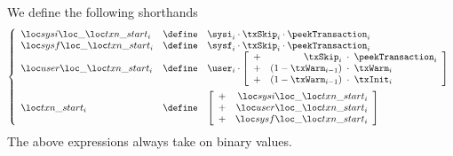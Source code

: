 We define the following shorthands
\[
	\left\{ \begin{array}{lcl}
		\sysiTransactionStart _{i} & \define & \sysi _{i} \cdot \txSkip _{i} \cdot \peekTransaction _{i} \\
		\sysfTransactionStart _{i} & \define & \sysf _{i} \cdot \txSkip _{i} \cdot \peekTransaction _{i} \\
		\userTransactionStart _{i} & \define &
		\user _{i} \cdot
		\left[ \begin{array}{rrcl}
			+ & \txSkip _{i}           & \!\!\!\cdot\!\!\! & \peekTransaction _{i} \\
			+ & (1 - \txWarm _{i - 1}) & \!\!\!\cdot\!\!\! & \txWarm          _{i} \\
			+ & (1 - \txWarm _{i - 1}) & \!\!\!\cdot\!\!\! & \txInit          _{i} \\
		\end{array} \right]
		\vspace{2mm}
		\\
		\transactionStart _{i} & \define &
		\left[ \begin{array}{rrcl}
			+ & \sysiTransactionStart _{i} \\
			+ & \userTransactionStart _{i} \\
			+ & \sysfTransactionStart _{i} \\
		\end{array} \right]
	\end{array} \right.
\]
\saNote{}
The above expressions always take on binary values.
